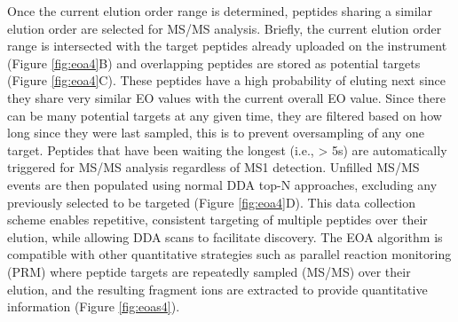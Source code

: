 Once the current elution order range is determined, peptides sharing a similar elution order are selected for MS/MS analysis. Briefly, the current elution order range is intersected with the target peptides already uploaded on the instrument (Figure \ref{fig:eoa4}B) and overlapping peptides are stored as potential targets (Figure \ref{fig:eoa4}C). These peptides have a high probability of eluting next since they share very similar EO values with the current overall EO value. Since there can be many potential targets at any given time, they are filtered based on how long since they were last sampled, this is to prevent oversampling of any one target. Peptides that have been waiting the longest (i.e., > 5s) are automatically triggered for MS/MS analysis regardless of MS1 detection. Unfilled MS/MS events are then populated using normal DDA top-N approaches, excluding any \mz{} previously selected to be targeted (Figure \ref{fig:eoa4}D). This data collection scheme enables repetitive, consistent targeting of multiple peptides over their elution, while allowing DDA scans to facilitate discovery. The EOA algorithm is compatible with other quantitative strategies such as parallel reaction monitoring (PRM) where peptide targets are repeatedly sampled (MS/MS) over their elution, and the resulting fragment ions are extracted to provide quantitative information (Figure \ref{fig:eoas4}).\cite{prm,gallien}
